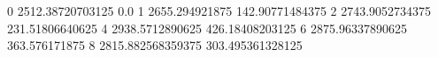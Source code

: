 0 2512.38720703125 0.0
1 2655.294921875 142.90771484375
2 2743.9052734375 231.51806640625
4 2938.5712890625 426.18408203125
6 2875.96337890625 363.576171875
8 2815.882568359375 303.495361328125

